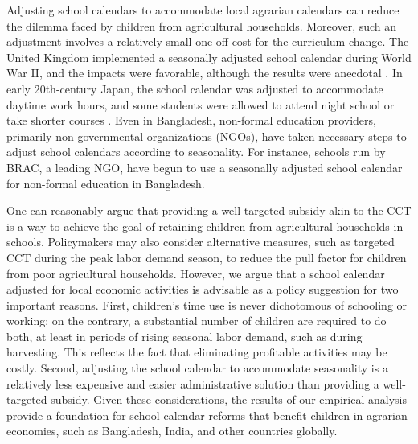 \documentclass[12pt,letterpaper]{article}
\newcommand{\0}{\ensuremath{\mbox{\boldmath $0$}}}
\begin{document}
Adjusting school calendars to accommodate local agrarian calendars can reduce the dilemma faced by children from agricultural households. Moreover, such an adjustment involves a relatively small one-off cost for the curriculum change. The United Kingdom implemented a seasonally adjusted school calendar during World War II, and the impacts were favorable, although the results were anecdotal \citep[][190-191]{Moore2004}. In early 20th-century Japan, the school calendar was adjusted to accommodate daytime work hours, and some students were allowed to attend night school or take shorter courses \citep[][Chapter 3]{JICA2004}. Even in Bangladesh, non-formal education providers, primarily non-governmental organizations (NGOs), have taken necessary steps to adjust school calendars according to seasonality. For instance, schools run by BRAC, a leading NGO, have begun to use a seasonally adjusted school calendar for non-formal education in Bangladesh.

One can reasonably argue that providing a well-targeted subsidy akin to the CCT is a way to achieve the goal of retaining children from agricultural households in schools. Policymakers may also consider alternative measures, such as targeted CCT during the peak labor demand season, to reduce the pull factor for children from poor agricultural households. However, we argue that a school calendar adjusted for local economic activities is advisable as a policy suggestion for two important reasons. First, children's time use is never dichotomous of schooling or working; on the contrary, a substantial number of children are required to do both, at least in periods of rising seasonal labor demand, such as during harvesting. This reflects the fact that eliminating profitable activities may be costly. Second, adjusting the school calendar to accommodate seasonality is a relatively less expensive and easier administrative solution than providing a well-targeted subsidy. Given these considerations, the results of our empirical analysis provide a foundation for school calendar reforms that benefit children in agrarian economies, such as Bangladesh, India, and other countries globally.




\pagebreak

\doublespacing



\pagebreak
\renewcommand{\thefigure}{A\arabic{figure}}
\renewcommand{\theHfigure}{A\arabic{figure}}
\setcounter{figure}{0}

\renewcommand{\thetable}{A\arabic{table}}
\renewcommand{\theHtable}{A\arabic{table}}
\setcounter{table}{0}
\end{document}
